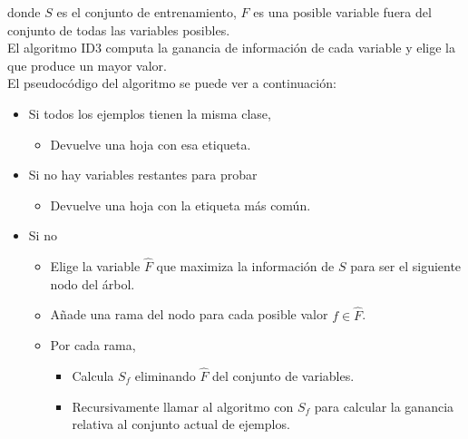 donde $S$ es el conjunto de entrenamiento, $F$ es una posible variable fuera del conjunto de todas las variables posibles.\\

El algoritmo ID3 computa la ganancia de información de cada variable y elige la que produce un mayor valor.\\

El pseudocódigo del algoritmo se puede ver a continuación:

\begin{itemize}
\item Si todos los ejemplos tienen la misma clase,

\begin{itemize}
\item Devuelve una hoja con esa etiqueta.
\end{itemize}

\item Si no hay variables restantes para probar

\begin{itemize}
\item Devuelve una hoja con la etiqueta más común.
\end{itemize}

\item Si no

\begin{itemize}
\item Elige la variable $\hat{F}$ que maximiza la información de $S$ para ser el siguiente nodo del árbol.
\item Añade una rama del nodo para cada posible valor $f \in \hat{F}$.
\item Por cada rama,

\begin{itemize}
\item Calcula $S_f$ eliminando $\hat{F}$ del conjunto de variables.
\item Recursivamente llamar al algoritmo con $S_f$ para calcular la ganancia relativa al conjunto actual de ejemplos.
\end{itemize}

\end{itemize}

\end{itemize}


